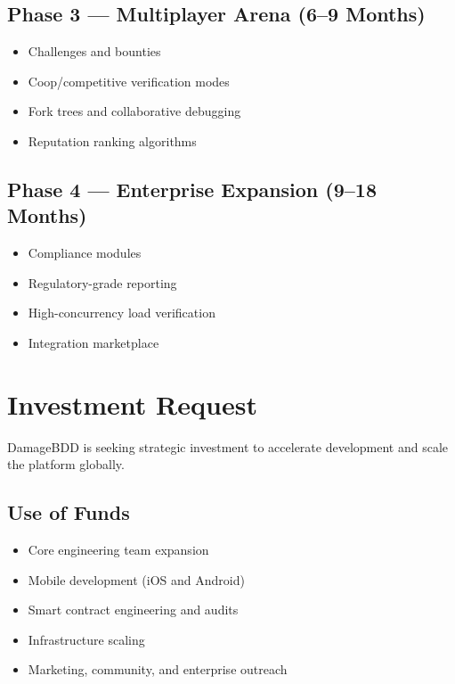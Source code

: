 \documentclass[12pt,a4paper]{article}
\begin{document}
\subsection{Phase 3 — Multiplayer Arena (6–9 Months)}

\begin{itemize}
    \item Challenges and bounties
    \item Coop/competitive verification modes
    \item Fork trees and collaborative debugging
    \item Reputation ranking algorithms
\end{itemize}

\subsection{Phase 4 — Enterprise Expansion (9–18 Months)}

\begin{itemize}
    \item Compliance modules
    \item Regulatory-grade reporting
    \item High-concurrency load verification
    \item Integration marketplace
\end{itemize}

\section{Investment Request}

DamageBDD is seeking strategic investment to accelerate development and scale the platform globally.

\subsection{Use of Funds}

\begin{itemize}
    \item Core engineering team expansion
    \item Mobile development (iOS and Android)
    \item Smart contract engineering and audits
    \item Infrastructure scaling
    \item Marketing, community, and enterprise outreach
\end{itemize}
\end{document}
